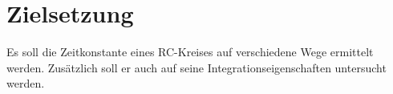 \section{Zielsetzung}
\label{sec:Zielsetzung}
Es soll die Zeitkonstante eines RC-Kreises auf verschiedene Wege ermittelt werden.
Zusätzlich soll er auch auf seine Integrationseigenschaften untersucht werden. 
